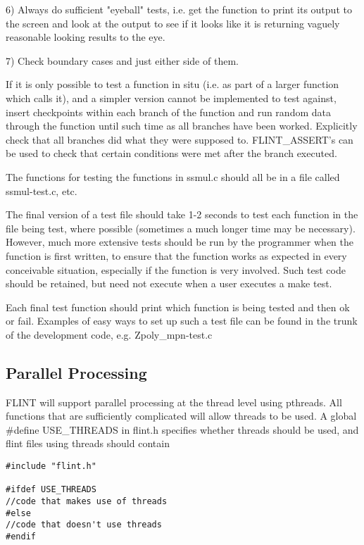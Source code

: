 \documentclass[a4paper,10pt]{article}
\begin{document}
6) Always do sufficient "eyeball" tests, i.e. get the function to print its output to the screen and look at the output to see if it looks like it is returning vaguely reasonable looking results to the eye.

7) Check boundary cases and just either side of them.

If it is only possible to test a function in situ (i.e. as part of a larger function which calls it), and a simpler version cannot be implemented to test against, insert checkpoints within each branch of the function and run random data through the function until such time as all branches have been worked. Explicitly check that all branches did what they were supposed to. FLINT\_ASSERT's can be used to check that certain conditions were met after the branch executed.

The functions for testing the functions in ssmul.c should all be in a file called ssmul-test.c, etc.

The final version of a test file should take 1-2 seconds to test each function in the file being test, where possible (sometimes a much longer time may be necessary). However, much more extensive tests should be run by the programmer when the function is first written, to ensure that the function works as expected in every conceivable situation, especially if the function is very involved. Such test code should be retained, but need not execute when a user executes a make test.

Each final test function should print which function is being tested and then ok or fail. Examples of easy ways to set up such a test file can be found in the trunk of the development code, e.g. Zpoly\_mpn-test.c 

\subsection{Parallel Processing}
FLINT will support parallel processing at the thread level using pthreads. All functions that are sufficiently complicated will allow threads to be used. A global \#define USE\_THREADS in flint.h specifies whether threads should be used, and flint files using threads should contain 

\begin{verbatim}#include "flint.h"

#ifdef USE_THREADS
//code that makes use of threads
#else
//code that doesn't use threads
#endif\end{verbatim}
\end{document}

